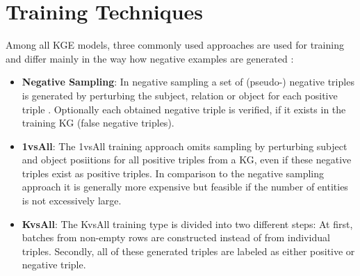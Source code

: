 \section{Training Techniques}
\label{sec:training_techniques}

Among all \ac{KGE} models, three commonly used approaches are used for training and differ mainly in the way how negative examples are generated \cite{Ruffinelli2020You}:
\begin{itemize}
    \item  
    \textbf{Negative Sampling}:
    In negative sampling a set of (pseudo-) negative triples is generated by perturbing the subject, relation or object for each positive triple .
    Optionally each obtained negative triple is verified, if it exists in the training \ac{KG} (false negative triples).
    
    \item  
    \textbf{1vsAll}:
    The 1vsAll training approach omits sampling by perturbing subject and object posiitions for all positive triples from a \ac{KG}, even if these negative triples exist as positive triples.
    In comparison to the negative sampling approach it is generally more expensive but feasible if the number of entities is not excessively large.
        
    \item  
    \textbf{KvsAll}: 
    The KvsAll training type is divided into two different steps:
    At first, batches from non-empty rows are constructed instead of from individual triples.
    Secondly, all of these generated triples are labeled as either positive or negative triple.
\end{itemize}



